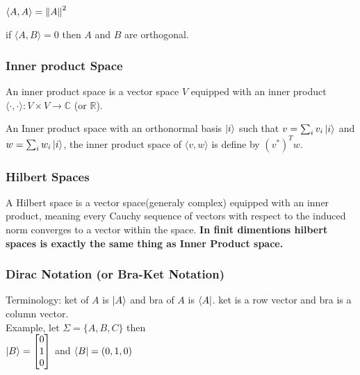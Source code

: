 \documentclass[5pt]{article}
\begin{document}
\begin{multicols}{3}
\begin{properties}
     \begin{itemize*}
          \item $\langle A,A\rangle=\norm{A}^2$
          \item if $\langle A,B\rangle=0$ then $A$ and $B$ are orthogonal.      
     \end{itemize*}
\end{properties}

\subsubsection{Inner product Space}

An inner product space is a vector space $V$ equipped with an inner product $\langle\cdot,\cdot\rangle : V \times V \to \mathbb{C}$ (or $\mathbb{R}$).

An Inner product space with an orthonormal basis $\ket{i}$ such that $v=\sum_iv_i\ket{i}$ and $w=\sum_iw_i\ket{i}$, the inner product space of $\langle v,w \rangle$ is define by $(v^*)^Tw$.

 
\subsubsection{Hilbert Spaces}
A Hilbert space is a vector space(generaly complex) equipped with an inner product, 
meaning every Cauchy sequence of vectors with respect to the induced norm converges to a vector within the space.
\textbf{In finit dimentions hilbert spaces is exactly the same thing as Inner Product space.}


\subsubsection{Dirac Notation \footnotesize{(or Bra-Ket Notation)}}
Terminology: ket of $A$ is $\ket{A}$ and bra of $A$ is $\bra{A}$. ket is a row vector and bra is a column vector.\\
Example, let $\Sigma=\{A,B,C\}$ then\\
$\ket{B}=\begin{bmatrix}0\\1\\0 \end{bmatrix}$ and $\bra{B}=(0,1,0)$\\


\end{multicols}
\end{document}
